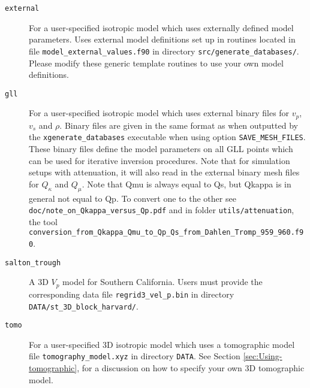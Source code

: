 \begin{description}
\begin{description}
\begin{description}
\item [{\texttt{external}}] For a user-specified isotropic model which
uses externally defined model parameters. Uses external model definitions
set up in routines located in file \texttt{model\_external\_values.f90}
in directory \texttt{src/generate\_databases/}. Please modify these
generic template routines to use your own model definitions.

\item [{\texttt{gll}}] For a user-specified isotropic model which uses
external binary files for $v_{p}$, $v_{s}$ and $\rho$. Binary files
are given in the same format as when outputted by the \texttt{xgenerate\_databases}
executable when using option \texttt{SAVE\_MESH\_FILES}. These binary
files define the model parameters on all GLL points which can be used
for iterative inversion procedures. Note that for simulation setups with attenuation,
it will also read in the external binary mesh files for $Q_{\kappa}$ and $Q_{\mu}$.
Note that Qmu is always equal to Qs, but Qkappa is in general not equal to Qp.
To convert one to the other see \texttt{doc/note\_on\_Qkappa\_versus\_Qp.pdf}
and in folder \texttt{utils/attenuation}, the tool
\texttt{conversion\_from\_Qkappa\_Qmu\_to\_Qp\_Qs\_from\_Dahlen\_Tromp\_959\_960.f90}.


\item [{\texttt{salton\_trough}}] A 3D $V_{p}$ model for Southern California.
Users must provide the corresponding data file \texttt{regrid3\_vel\_p.bin}
in directory \texttt{DATA/st\_3D\_block\_harvard/}.

\item [{\texttt{tomo}}] For a user-specified 3D isotropic model which uses
a tomographic model file \texttt{tomography\_model.xyz} in directory
\texttt{DATA}. See Section \ref{sec:Using-tomographic}, for a discussion
on how to specify your own 3D tomographic model.
\end{description}
\end{description}


\end{description}

